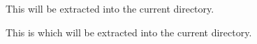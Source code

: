 \documentclass{article}
\begin{document}
This  will be extracted into the current directory.

This is  which will be extracted into the current directory.
\end{document}
